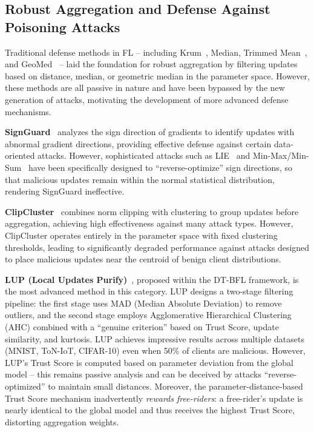 \documentclass[runningheads]{llncs}
\begin{document}
\subsection{Robust Aggregation and Defense Against Poisoning Attacks}

Traditional defense methods in FL -- including Krum~\cite{blanchard2017machine}, Median, Trimmed Mean~\cite{yin2018byzantine}, and GeoMed~\cite{pillutla2022robust} -- laid the foundation for robust aggregation by filtering updates based on distance, median, or geometric median in the parameter space. However, these methods are all passive in nature and have been bypassed by the new generation of attacks, motivating the development of more advanced defense mechanisms.

\textbf{SignGuard}~\cite{xu2022signguard} analyzes the sign direction of gradients to identify updates with abnormal gradient directions, providing effective defense against certain data-oriented attacks. However, sophisticated attacks such as LIE~\cite{baruch2019little} and Min-Max/Min-Sum~\cite{shejwalkar2021manipulating} have been specifically designed to ``reverse-optimize'' sign directions, so that malicious updates remain within the normal statistical distribution, rendering SignGuard ineffective.

\textbf{ClipCluster}~\cite{zeng2024clipcluster} combines norm clipping with clustering to group updates before aggregation, achieving high effectiveness against many attack types. However, ClipCluster operates entirely in the parameter space with fixed clustering thresholds, leading to significantly degraded performance against attacks designed to place malicious updates near the centroid of benign client distributions.

\textbf{LUP (Local Updates Purify)}~\cite{issa2025dtbfl}, proposed within the DT-BFL framework, is the most advanced method in this category. LUP designs a two-stage filtering pipeline: the first stage uses MAD (Median Absolute Deviation) to remove outliers, and the second stage employs Agglomerative Hierarchical Clustering (AHC) combined with a ``genuine criterion'' based on Trust Score, update similarity, and kurtosis. LUP achieves impressive results across multiple datasets (MNIST, ToN-IoT, CIFAR-10) even when 50\% of clients are malicious. However, LUP's Trust Score is computed based on parameter deviation from the global model -- this remains passive analysis and can be deceived by attacks ``reverse-optimized'' to maintain small distances. Moreover, the parameter-distance-based Trust Score mechanism inadvertently \emph{rewards free-riders}: a free-rider's update is nearly identical to the global model and thus receives the highest Trust Score, distorting aggregation weights.
\end{document}
